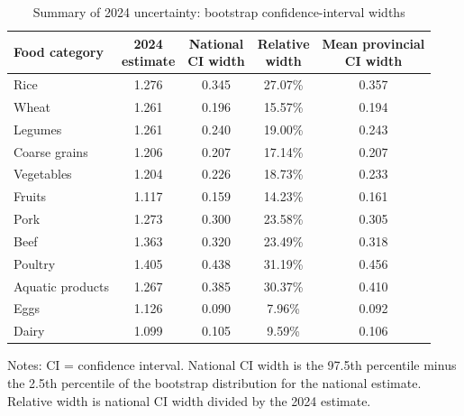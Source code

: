 \documentclass[preprint,12pt,authoryear]{elsarticle}
\begin{document}
\begin{table}[htbp]
\centering
\begin{threeparttable}
\caption{Summary of 2024 uncertainty: bootstrap confidence-interval widths}
\label{tab:uncertainty}
\small
\setlength{\tabcolsep}{0pt} 
\begin{tabular*}{\textwidth}{@{\extracolsep{\fill}} l cccc @{}}
\toprule
Food category & \shortstack{2024\\estimate} & \shortstack{National\\CI width} & \shortstack{Relative\\width} & \shortstack{Mean provincial\\CI width} \\
\midrule
Rice             & 1.276 & 0.345 & 27.07\% & 0.357 \\
Wheat            & 1.261 & 0.196 & 15.57\% & 0.194 \\
Legumes          & 1.261 & 0.240 & 19.00\% & 0.243 \\
Coarse grains    & 1.206 & 0.207 & 17.14\% & 0.207 \\
Vegetables       & 1.204 & 0.226 & 18.73\% & 0.233 \\
Fruits           & 1.117 & 0.159 & 14.23\% & 0.161 \\
Pork             & 1.273 & 0.300 & 23.58\% & 0.305 \\
Beef             & 1.363 & 0.320 & 23.49\% & 0.318 \\
Poultry          & 1.405 & 0.438 & 31.19\% & 0.456 \\
Aquatic products & 1.267 & 0.385 & 30.37\% & 0.410 \\
Eggs             & 1.126 & 0.090 & 7.96\%  & 0.092 \\
Dairy            & 1.099 & 0.105 & 9.59\%  & 0.106 \\
\bottomrule
\end{tabular*}
\begin{tablenotes}[flushleft]
\scriptsize
\item Notes: CI = confidence interval. National CI width is the 97.5th percentile minus the 2.5th percentile of the bootstrap distribution for the national estimate. Relative width is national CI width divided by the 2024 estimate.
\end{tablenotes}
\end{threeparttable}
\end{table}
\end{document}
